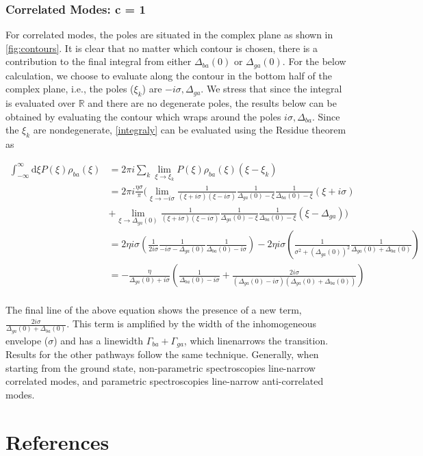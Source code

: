 \documentclass[aip, jcp, reprint, onecolumn]{revtex4-2}
\begin{document}
\subsubsection{Correlated Modes: c = 1}
For correlated modes, the poles are situated in the complex plane as shown in \autoref{fig:contours}.
It is clear that no matter which contour is chosen, there is a contribution to the final integral from either $\Delta_{ba}(0)$ or $\Delta_{ga}(0)$. 
For the below calculation, we choose to evaluate along the contour in the bottom half of the complex plane, i.e., the poles ($\xi_k$) are $-i\sigma, \Delta_{ga}$.
We stress that since the integral is evaluated over $\mathbb{R}$ and there are no degenerate poles, the results below can be obtained by evaluating the contour which wraps around the poles $i\sigma, \Delta_{ba}$. 
Since the $\xi_k$ are nondegenerate, \autoref{integraly} can be evaluated using the Residue theorem as 
\begin{widetext}
	\begin{equation}
		\begin{split}
			\int_{-\infty}^\infty \mathrm{d}\xi P(\xi) \rho_{ba}(\xi) &= 2\pi i \sum_k \lim_{\xi \rightarrow \xi_k} P(\xi) \rho_{ba}(\xi) (\xi - \xi_k)\\
			&= 2\pi i \frac{\eta \sigma}{\pi} ( \lim_{\xi \rightarrow -i\sigma} \frac{1}{(\xi + i\sigma)(\xi - i\sigma)} \frac{1}{\Delta_{ga}(0) - \xi} \frac{1}{\Delta_{ba}(0) - \xi} (\xi + i \sigma) \\ &+
			\lim_{\xi \rightarrow \Delta_{ga}(0)} \frac{1}{(\xi + i\sigma)(\xi - i\sigma)} \frac{1}{\Delta_{ga}(0) - \xi} \frac{1}{\Delta_{ba}(0) - \xi} (\xi - \Delta_{ga}))\\
			&= 2 \eta i \sigma (\frac{1}{2 i \sigma} \frac{1}{-i \sigma - \Delta_{ga}(0)} \frac{1}{\Delta_{ba}(0) - i\sigma} ) - 2 \eta i \sigma (\frac{1}{\sigma^2 + (\Delta_{ga} (0))^2} \frac{1}{\Delta_{ga}(0) + \Delta_{ba}(0)} )\\
			&= -\frac{\eta}{\Delta_{ga}(0) + i \sigma} (\frac{1}{\Delta_{ba}(0) - i \sigma} + \frac{2i\sigma}{(\Delta_{ga}(0) - i \sigma)(\Delta_{ga}(0) + \Delta_{ba}(0))})\\
		\end{split}
	\end{equation}
\end{widetext}
The final line of the above equation shows the presence of a new term, $\frac{2i\sigma}{\Delta_{ga}(0) + \Delta_{ba}(0)}$. 
This term is amplified by the width of the inhomogeneous envelope ($\sigma$) and has a linewidth $\Gamma_{ba} + \Gamma_{ga}$, which linenarrows the transition. 
Results for the other pathways follow the same technique.
Generally, when starting from the ground state, non-parametric spectroscopies line-narrow correlated modes, and parametric spectroscopies line-narrow anti-correlated modes. \cite{Dick83_1, RN425}


\section{References}

\end{document}
